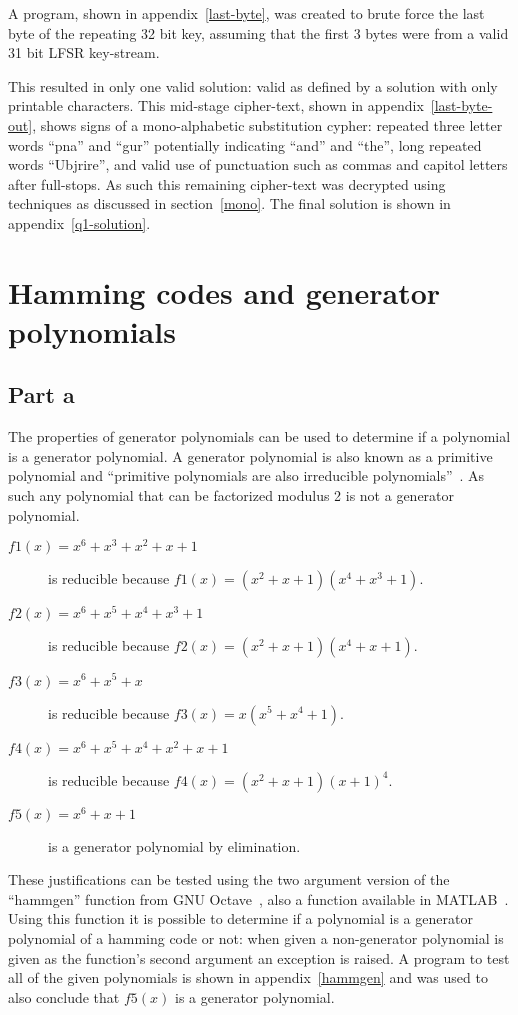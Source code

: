 \documentclass[pdftex, 12pt, a4paper]{article}
\begin{document}
A program, shown in appendix~\ref{last-byte}, was created to brute force the last byte of the repeating 32 bit key, assuming that the first 3 bytes were from a valid 31 bit LFSR key-stream.

This resulted in only one valid solution: valid as defined by a solution with only printable characters.  This mid-stage cipher-text, shown in appendix~\ref{last-byte-out}, shows signs of a mono-alphabetic substitution cypher: repeated three letter words ``pna'' and ``gur'' potentially indicating ``and'' and ``the'', long repeated words ``Ubjrire'', and valid use of punctuation such as commas and capitol letters after full-stops. As such this remaining cipher-text was decrypted using techniques as discussed in section~\ref{mono}.  The final solution is shown in appendix~\ref{q1-solution}.

\section{Hamming codes and generator polynomials}
\subsection{Part a}
The properties of generator polynomials can be used to determine if a polynomial is a generator polynomial.  A generator polynomial is also known as a primitive polynomial and ``primitive polynomials are also irreducible polynomials''~\cite{wolfram-primative}.  As such any polynomial that can be factorized modulus 2 is not a generator polynomial.

\begin{description}
    \item[$f1(x) = x^6 + x^3 + x^2 + x + 1$] is reducible because $f1(x) = (x^2+x+1)(x^4+x^3+1)$.
    \item[$f2(x) = x^6 + x^5 + x^4 + x^3 + 1$] is reducible because $f2(x) = (x^2+x+1)(x^4+x+1)$.
    \item[$f3(x) = x^6 + x^5 + x$] is reducible because $f3(x) = x(x^5 + x^4 + 1)$.
    \item[$f4(x) = x^6 + x^5 +x^4 + x^2 +x + 1$] is reducible because $f4(x) = (x^2+x+1)(x+1)^4$.
    \item[$f5(x) = x^6 + x + 1$] is a generator polynomial by elimination.
\end{description}

These justifications can be tested using the two argument version of the ``hammgen'' function from GNU Octave~\cite{hammgen-octave}, also a function available in MATLAB~\cite{hammgen-matlab}. Using this function it is possible to determine if a polynomial is a generator polynomial of a hamming code or not: when given a non-generator polynomial is given as the function's second argument an exception is raised.  A program to test all of the given polynomials is shown in appendix~\ref{hammgen} and was used to also conclude that $f5(x)$ is a generator polynomial.
\end{document}
